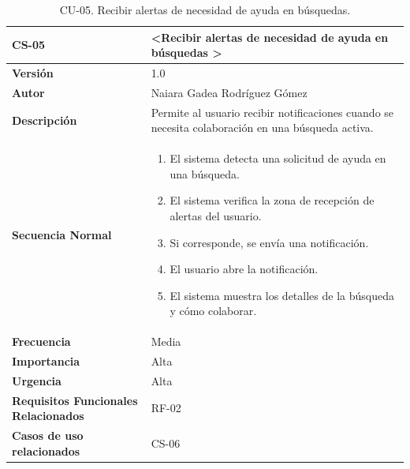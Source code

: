 \begin{table}[htbp] %
\centering
\begin{tabular}{ |m{3cm}|m{11cm}|  } 
\hline
\cellcolor[HTML]{B9E3F0}\centering\textbf{CS-05} & \cellcolor[HTML]{B9E3F0}\textbf{\textless Recibir alertas de necesidad de ayuda en búsquedas \textgreater}\\

\hline
\cellcolor[HTML]{EFEFEF}\textbf{Versión}             & 1.0  \\
\hline
\cellcolor[HTML]{EFEFEF}\textbf{Autor}                & Naiara Gadea Rodríguez Gómez\\
\hline
\cellcolor[HTML]{EFEFEF}\textbf{Descripción}                & { Permite al usuario recibir notificaciones cuando se necesita colaboración en una búsqueda activa. }\\
\hline
\cellcolor[HTML]{EFEFEF}\textbf{Secuencia \newline Normal}                &                 
        \begin{enumerate}
            \item El sistema detecta una solicitud de ayuda en una búsqueda.
            \item El sistema verifica la zona de recepción de alertas del usuario.
            \item Si corresponde, se envía una notificación.
            \item El usuario abre la notificación.
            \item El sistema muestra los detalles de la búsqueda y cómo colaborar.
        \end{enumerate}\\
\hline
\cellcolor[HTML]{EFEFEF}\textbf{Frecuencia}                & Media\\
\hline
\cellcolor[HTML]{EFEFEF}\textbf{Importancia}                & Alta\\
\hline
\cellcolor[HTML]{EFEFEF}\textbf{Urgencia}                & Alta\\
\hline
\cellcolor[HTML]{EFEFEF}\textbf{Requisitos Funcionales Relacionados}                & { RF-02 }\\
\hline
\cellcolor[HTML]{EFEFEF}\textbf{Casos de uso relacionados}                & { CS-06 }\\
\hline
\end{tabular}
\caption{CU-05. Recibir alertas de necesidad de ayuda en búsquedas.}
\end{table}


